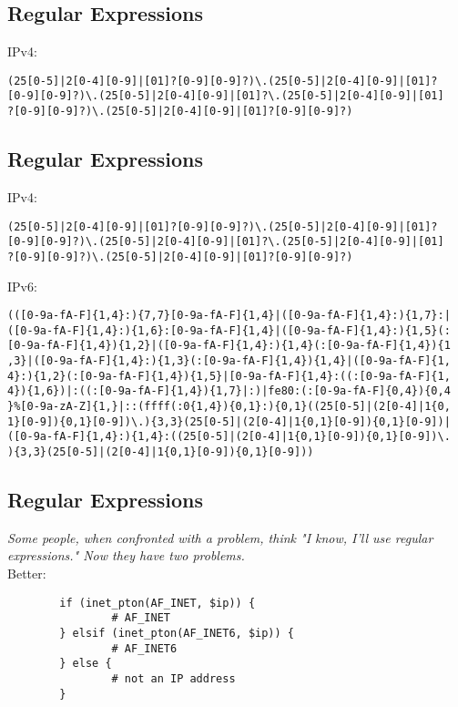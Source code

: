 \documentclass[xga]{xdvislides}
\begin{document}
\subsection{Regular Expressions}
IPv4:
\begin{verbatim}
(25[0-5]|2[0-4][0-9]|[01]?[0-9][0-9]?)\.(25[0-5]|2[0-4][0-9]|[01]?
[0-9][0-9]?)\.(25[0-5]|2[0-4][0-9]|[01]?\.(25[0-5]|2[0-4][0-9]|[01]
?[0-9][0-9]?)\.(25[0-5]|2[0-4][0-9]|[01]?[0-9][0-9]?)
\end{verbatim}

\subsection{Regular Expressions}
IPv4:
\begin{verbatim}
(25[0-5]|2[0-4][0-9]|[01]?[0-9][0-9]?)\.(25[0-5]|2[0-4][0-9]|[01]?
[0-9][0-9]?)\.(25[0-5]|2[0-4][0-9]|[01]?\.(25[0-5]|2[0-4][0-9]|[01]
?[0-9][0-9]?)\.(25[0-5]|2[0-4][0-9]|[01]?[0-9][0-9]?)
\end{verbatim}

IPv6:
\begin{verbatim}
(([0-9a-fA-F]{1,4}:){7,7}[0-9a-fA-F]{1,4}|([0-9a-fA-F]{1,4}:){1,7}:|
([0-9a-fA-F]{1,4}:){1,6}:[0-9a-fA-F]{1,4}|([0-9a-fA-F]{1,4}:){1,5}(:
[0-9a-fA-F]{1,4}){1,2}|([0-9a-fA-F]{1,4}:){1,4}(:[0-9a-fA-F]{1,4}){1
,3}|([0-9a-fA-F]{1,4}:){1,3}(:[0-9a-fA-F]{1,4}){1,4}|([0-9a-fA-F]{1,
4}:){1,2}(:[0-9a-fA-F]{1,4}){1,5}|[0-9a-fA-F]{1,4}:((:[0-9a-fA-F]{1,
4}){1,6})|:((:[0-9a-fA-F]{1,4}){1,7}|:)|fe80:(:[0-9a-fA-F]{0,4}){0,4
}%[0-9a-zA-Z]{1,}|::(ffff(:0{1,4}){0,1}:){0,1}((25[0-5]|(2[0-4]|1{0,
1}[0-9]){0,1}[0-9])\.){3,3}(25[0-5]|(2[0-4]|1{0,1}[0-9]){0,1}[0-9])|
([0-9a-fA-F]{1,4}:){1,4}:((25[0-5]|(2[0-4]|1{0,1}[0-9]){0,1}[0-9])\.
){3,3}(25[0-5]|(2[0-4]|1{0,1}[0-9]){0,1}[0-9]))
\end{verbatim}

\subsection{Regular Expressions}
{\em Some people, when confronted with a problem,
think "I know, I'll use regular expressions." Now they
have two problems.} \\

Better:
\begin{verbatim}
        if (inet_pton(AF_INET, $ip)) {
                # AF_INET
        } elsif (inet_pton(AF_INET6, $ip)) {
                # AF_INET6
        } else {
                # not an IP address
        }
\end{verbatim}
\end{document}
